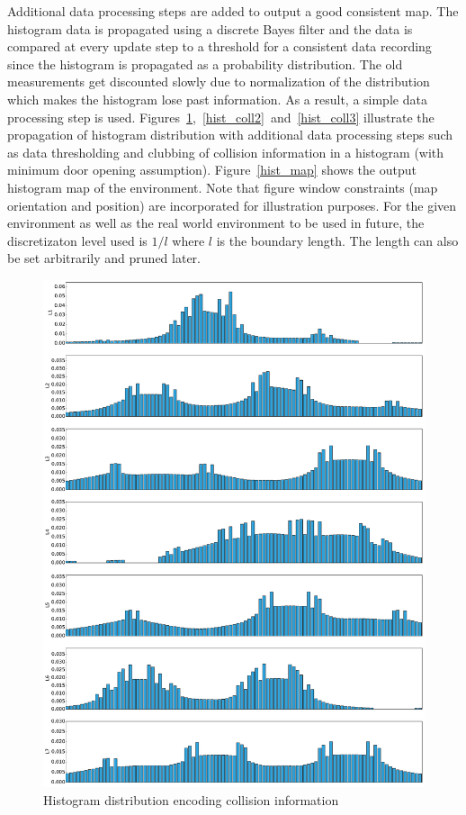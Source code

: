 Additional data processing steps are added to output a good consistent map. The histogram data is propagated using a discrete Bayes filter and the data is compared at every update step to a threshold for a consistent data recording since the histogram is propagated as a probability distribution. The old measurements get discounted slowly due to normalization of the distribution which makes the histogram lose past information. As a result, a simple data processing step is used. Figures~\ref{hist_coll},~\ref{hist_coll2}~and~\ref{hist_coll3} illustrate the propagation of histogram distribution with additional data processing steps such as data thresholding and clubbing of collision information in a histogram (with minimum door opening assumption). Figure~\ref{hist_map} shows the output histogram map of the environment. Note that figure window constraints (map orientation and position) are incorporated for illustration purposes. For the given environment as well as the real world environment to be used in future, the discretizaton level used is $1/l$ where $l$ is the boundary length. The length can also be set arbitrarily and pruned later. 
\begin{figure}
\centering
\includegraphics[width=\textwidth]{./images/hist_coll}
\caption[Histogram distribution encoding collision information]{Histogram distribution encoding collision information}
\label{hist_coll}
\end{figure}

